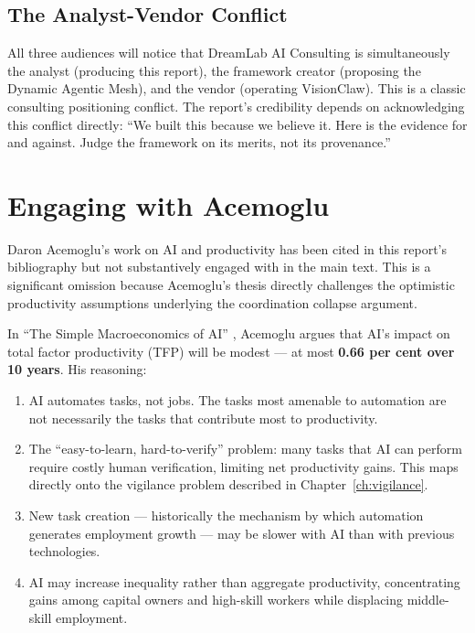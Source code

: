 \subsection{The Analyst-Vendor Conflict}

All three audiences will notice that DreamLab AI Consulting is simultaneously the analyst (producing this report), the framework creator (proposing the Dynamic Agentic Mesh), and the vendor (operating VisionClaw). This is a classic consulting positioning conflict. The report's credibility depends on acknowledging this conflict directly: ``We built this because we believe it. Here is the evidence for and against. Judge the framework on its merits, not its provenance.''

\section{Engaging with Acemoglu}

Daron Acemoglu's work on AI and productivity has been cited in this report's bibliography but not substantively engaged with in the main text. This is a significant omission because Acemoglu's thesis directly challenges the optimistic productivity assumptions underlying the coordination collapse argument.

\begin{evidencebox}[title={The Acemoglu Sceptical Thesis}]
In ``The Simple Macroeconomics of AI'' \parencite{Acemoglu2025}, Acemoglu argues that AI's impact on total factor productivity (TFP) will be modest --- at most \textbf{0.66 per cent over 10 years}. His reasoning:

\begin{enumerate}
  \item AI automates tasks, not jobs. The tasks most amenable to automation are not necessarily the tasks that contribute most to productivity.
  \item The ``easy-to-learn, hard-to-verify'' problem: many tasks that AI can perform require costly human verification, limiting net productivity gains. This maps directly onto the vigilance problem described in Chapter~\ref{ch:vigilance}.
  \item New task creation --- historically the mechanism by which automation generates employment growth --- may be slower with AI than with previous technologies.
  \item AI may increase inequality rather than aggregate productivity, concentrating gains among capital owners and high-skill workers while displacing middle-skill employment.
\end{enumerate}
\end{evidencebox}

